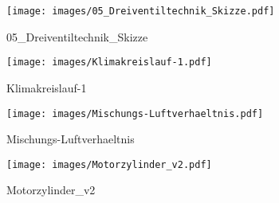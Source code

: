 %
%
\begin{figure}[!hb]%
    \centering
  \texttt{[image: images/05\_Dreiventiltechnik\_Skizze.pdf]}%
  \caption{05_Dreiventiltechnik_Skizze}%
\end{figure}

%
%
\begin{figure}[!hb]%
    \centering
  \texttt{[image: images/Klimakreislauf-1.pdf]}%
  \caption{Klimakreislauf-1}%
\end{figure}

%
%
\begin{figure}[!hb]%
    \centering
  \texttt{[image: images/Mischungs-Luftverhaeltnis.pdf]}%
  \caption{Mischungs-Luftverhaeltnis}%
\end{figure}

%
%
\begin{figure}[!hb]%
    \centering
  \texttt{[image: images/Motorzylinder\_v2.pdf]}%
  \caption{Motorzylinder_v2}%
\end{figure}

